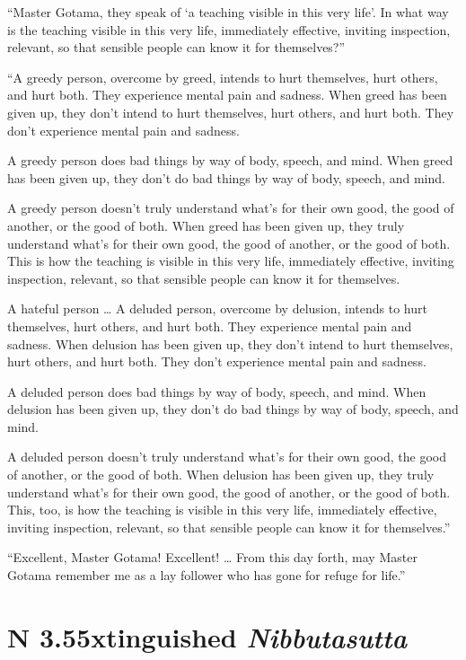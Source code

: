 \documentclass[12pt,openany]{book}%
\newcommand*{\suttatitleacronym}[1]{\smaller[2]{#1}\vspace*{.3em}}
\newcommand*{\suttatitletranslation}[1]{\linebreak{#1}}
\newcommand*{\suttatitleroot}[1]{\linebreak\smaller[2]\itshape{#1}}
\newcommand*{\tocacronym}[1]{\hspace*{-3.3em}{#1}\quad}
\newcommand*{\toctranslation}[1]{#1}
\newcommand*{\tocroot}[1]{(\textit{#1})}
\begin{document}
“Master Gotama, they speak of ‘a teaching visible in this very life’. In what way is the teaching visible in this very life, immediately effective, inviting inspection, relevant, so that sensible people can know it for themselves?” 

“A greedy person, overcome by greed, intends to hurt themselves, hurt others, and hurt both. They experience mental pain and sadness. When greed has been given up, they don’t intend to hurt themselves, hurt others, and hurt both. They don’t experience mental pain and sadness. 

A greedy person does bad things by way of body, speech, and mind. When greed has been given up, they don’t do bad things by way of body, speech, and mind. 

A greedy person doesn’t truly understand what’s for their own good, the good of another, or the good of both. When greed has been given up, they truly understand what’s for their own good, the good of another, or the good of both. This is how the teaching is visible in this very life, immediately effective, inviting inspection, relevant, so that sensible people can know it for themselves. 

A hateful person … A deluded person, overcome by delusion, intends to hurt themselves, hurt others, and hurt both. They experience mental pain and sadness. When delusion has been given up, they don’t intend to hurt themselves, hurt others, and hurt both. They don’t experience mental pain and sadness. 

A deluded person does bad things by way of body, speech, and mind. When delusion has been given up, they don’t do bad things by way of body, speech, and mind. 

A deluded person doesn’t truly understand what’s for their own good, the good of another, or the good of both. When delusion has been given up, they truly understand what’s for their own good, the good of another, or the good of both. This, too, is how the teaching is visible in this very life, immediately effective, inviting inspection, relevant, so that sensible people can know it for themselves.” 

“Excellent, Master Gotama! Excellent! … From this day forth, may Master Gotama remember me as a lay follower who has gone for refuge for life.” 

%
\section*{{\suttatitleacronym AN 3.55}{\suttatitletranslation Extinguished }{\suttatitleroot Nibbutasutta}}
\addcontentsline{toc}{section}{\tocacronym{AN 3.55} \toctranslation{Extinguished } \tocroot{Nibbutasutta}}
\end{document}
